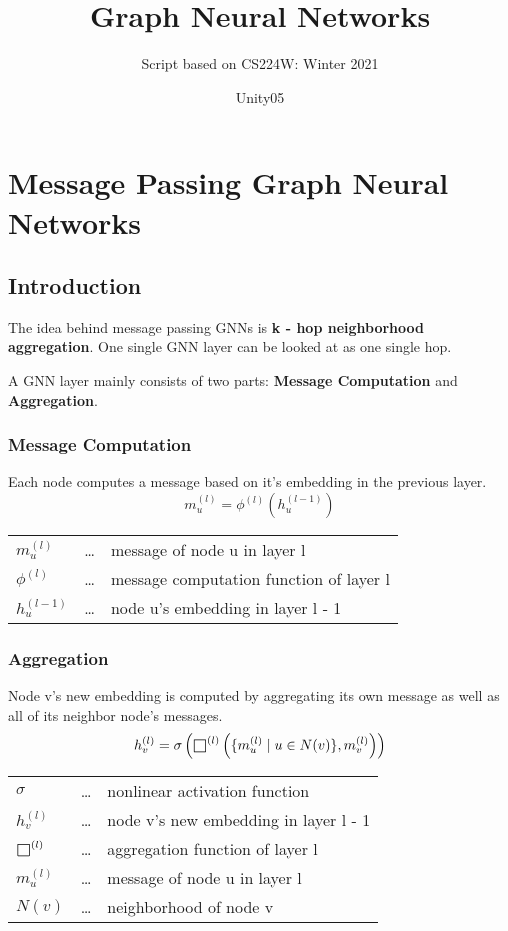 \documentclass[parskip=full]{scrartcl}
\title{Graph Neural Networks}
\subtitle{Script based on CS224W: Winter 2021 \cite{cs224w-notes}}
\author{Unity05}
\def\msquare{\mathord{\scalerel*{\Box}{gX}}}
\begin{document}
\begin{titlepage}
\maketitle
\end{titlepage}

\newpage
\tableofcontents
\newpage

\section{Message Passing Graph Neural Networks}

\subsection{Introduction}
The idea behind message passing GNNs is \textbf{k - hop neighborhood aggregation}.
One single GNN layer can be looked at as one single hop.

A GNN layer mainly consists of two parts: \textbf{Message Computation} and \textbf{Aggregation}.

\subsubsection{Message Computation}
Each node computes a message based on it's embedding in the previous layer.
\[m_u^{(l)} = \phi^{(l)}\left(h_u^{(l-1)}\right)\]
\begin{center}
\begin{tabular}{l c l}
	$m_u^{(l)}$ & \dots & message of node u in layer l \\
	$\phi^{(l)}$ & \dots & message computation function of layer l \\
	$h_u^{(l - 1)}$ & \dots & node u's embedding in layer l - 1
\end{tabular}
\end{center}

\subsubsection{Aggregation}
Node v's new embedding is computed by aggregating its own message as well as all of its neighbor node's messages.
\[h_v^{(l)} = \sigma\left(\msquare^{(l)}\left(\{m_u^{(l)} \mid u \in N(v)\}, m_v^{(l)}\right)\right)\]
\begin{center}
\begin{tabular}{l c l}
	$\sigma$ & \dots & nonlinear activation function \\
	$h_v^{(l)}$ & \dots & node v's new embedding in layer l - 1 \\
	$\msquare^{(l)}$ & \dots & aggregation function of layer l \\
	$m_u^{(l)}$ & \dots & message of node u in layer l \\
	$N(v)$ & \dots & neighborhood of node v
\end{tabular}
\end{center}
\end{document}
